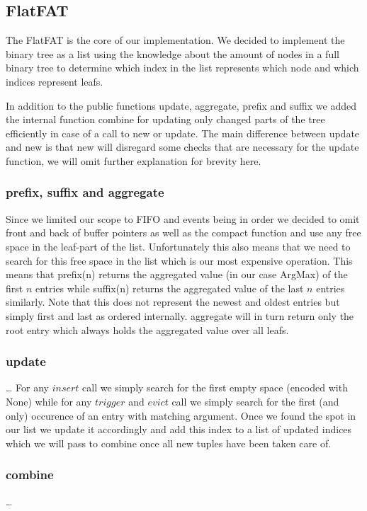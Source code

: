 \subsection{FlatFAT}
The FlatFAT is the core of our implementation. We decided to implement the binary tree
as a list using the knowledge about the amount of nodes in a full binary tree to determine
which index in the list represents which node and which indices represent leafs.

In addition to the public functions {update, aggregate, prefix} and {suffix} we
added the internal function {combine} for updating only changed parts of the tree
efficiently in case of a call to {new} or {update}. The main difference between
{update} and {new} is that {new} will disregard some checks that are necessary for
the update function, we will omit further explanation for brevity here.

\subsubsection{prefix, suffix and aggregate}
Since we limited our scope to FIFO and events being in order we decided to omit
front and back of buffer pointers as well as the compact function and use any free
space in the leaf-part of the list. Unfortunately this also means that we need
to search for this free space in the list which is our most expensive operation.
This means that {prefix(n)} returns the aggregated value (in our case ArgMax) of the
first $n$ entries while {suffix(n)} returns the aggregated value of the last $n$ entries
similarly. Note that this does not represent the newest and oldest entries but simply
first and last as ordered internally.
{aggregate} will in turn return only the root entry which always holds the aggregated
value over all leafs.

\subsubsection{update}
\ldots
For any $insert$ call we simply search for the first empty space (encoded with None) %
while for any $trigger$ and $evict$ call we simply search for the first (and only) occurence of
an entry with matching argument.
Once we found the spot in our list we update it accordingly and add this index to a
list of updated indices which we will pass to {combine} once all new tuples have been
taken care of.


\subsubsection{combine}
\ldots
